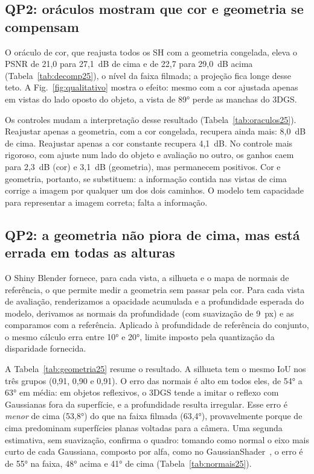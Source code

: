 \subsection{QP2: oráculos mostram que cor e geometria se compensam}



O oráculo de cor, que reajusta todos os SH com a geometria congelada, eleva o PSNR de 21,0 para 27,1~dB de cima e de 22,7 para 29,0~dB acima (Tabela~\ref{tab:decomp25}), o nível da faixa filmada; a projeção fica longe desse teto. A Fig.~\ref{fig:qualitativo} mostra o efeito: mesmo com a cor ajustada apenas em vistas do lado oposto do objeto, a vista de 89° perde as manchas do 3DGS.

Os controles mudam a interpretação desse resultado (Tabela~\ref{tab:oraculos25}). Reajustar apenas a geometria, com a cor congelada, recupera ainda mais: 8,0~dB de cima. Reajustar apenas a cor constante recupera 4,1~dB. No controle mais rigoroso, com ajuste num lado do objeto e avaliação no outro, os ganhos caem para 2,3~dB (cor) e 3,1~dB (geometria), mas permanecem positivos. Cor e geometria, portanto, se substituem: a informação contida nas vistas de cima corrige a imagem por qualquer um dos dois caminhos. O modelo tem capacidade para representar a imagem correta; falta a informação.



\subsection{QP2: a geometria não piora de cima, mas está errada em todas as alturas}\label{sec:geometria}

O Shiny Blender fornece, para cada vista, a silhueta e o mapa de normais de referência, o que permite medir a geometria sem passar pela cor. Para cada vista de avaliação, renderizamos a opacidade acumulada e a profundidade esperada do modelo, derivamos as normais da profundidade (com suavização de 9~px) e as comparamos com a referência. Aplicado à profundidade de referência do conjunto, o mesmo cálculo erra entre 10° e 20°, limite imposto pela quantização da disparidade fornecida.

A Tabela~\ref{tab:geometria25} resume o resultado. A silhueta tem o mesmo IoU nos três grupos (0,91, 0,90 e 0,91). O erro das normais é alto em todos eles, de 54° a 63° em média: em objetos reflexivos, o 3DGS tende a imitar o reflexo com Gaussianas fora da superfície, e a profundidade resulta irregular. Esse erro é \emph{menor} de cima (53,8°) do que na faixa filmada (63,4°), provavelmente porque de cima predominam superfícies planas voltadas para a câmera. Uma segunda estimativa, sem suavização, confirma o quadro: tomando como normal o eixo mais curto de cada Gaussiana, composto por alfa, como no GaussianShader~\cite{jiang2024gshader}, o erro é de 55° na faixa, 48° acima e 41° de cima (Tabela~\ref{tab:normais25}).

